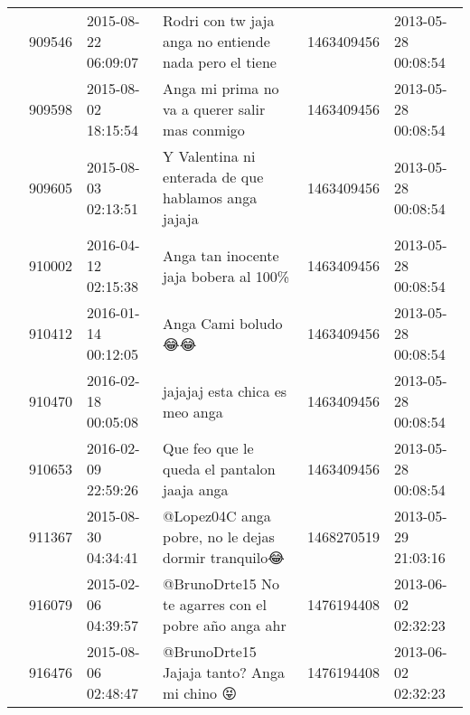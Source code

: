 \begin{tabular}{llllrl}
           & 909546  & 2015-08-22 06:09:07 &                                                                                        Rodri con tw jaja anga no entiende nada pero el tiene &  1463409456 & 2013-05-28 00:08:54 \\
           & 909598  & 2015-08-02 18:15:54 &                                                                                               Anga mi prima no va a querer salir mas conmigo &  1463409456 & 2013-05-28 00:08:54 \\
           & 909605  & 2015-08-03 02:13:51 &                                                                                          Y Valentina ni enterada de que hablamos anga jajaja &  1463409456 & 2013-05-28 00:08:54 \\
           & 910002  & 2016-04-12 02:15:38 &                                                                                                        Anga tan inocente jaja bobera al 100\% &  1463409456 & 2013-05-28 00:08:54 \\
           & 910412  & 2016-01-14 00:12:05 &                                                                                                                          Anga Cami boludo 😂😂 &  1463409456 & 2013-05-28 00:08:54 \\
           & 910470  & 2016-02-18 00:05:08 &                                                                                                               jajajaj esta chica es meo anga &  1463409456 & 2013-05-28 00:08:54 \\
           & 910653  & 2016-02-09 22:59:26 &                                                                                                  Que feo que le queda el pantalon jaaja anga &  1463409456 & 2013-05-28 00:08:54 \\
           & 911367  & 2015-08-30 04:34:41 &                                                                                          @Lopez04C anga pobre, no le dejas dormir tranquilo😂 &  1468270519 & 2013-05-29 21:03:16 \\
           & 916079  & 2015-02-06 04:39:57 &                                                                                         @BrunoDrte15 No te agarres con el pobre año anga ahr &  1476194408 & 2013-06-02 02:32:23 \\
           & 916476  & 2015-08-06 02:48:47 &                                                                                                   @BrunoDrte15 Jajaja tanto? Anga mi chino 😝 &  1476194408 & 2013-06-02 02:32:23 \\

\end{tabular}
